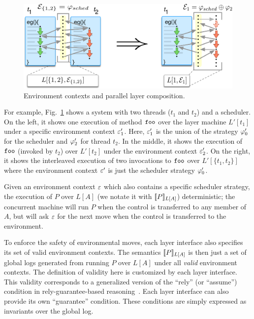 \begin{figure}[t]
\centering
\includegraphics[scale=.38]{figs/ccal/pcomp}
\caption{Environment contexts and parallel layer composition.}
\label{fig:pcomp}
\end{figure}

For example, Fig.~\ref{fig:pcomp} shows a system with two threads
($t_1$ and $t_2$) and a scheduler. On the left, it shows one execution
of method $\codeinmath{foo}$ over the layer machine $L'[t_1]$ under a specific
environment context $\oracle'_1$.  Here, $\oracle'_1$ is the union of
the strategy $\stratp{0}$ for the scheduler and $\stratp{2}$ for
thread $t_2$. In the middle, it shows the execution of $\codeinmath{foo}$
(invoked by $t_2$) over $L'[t_2]$ under the environment context
$\oracle'_2$. On the right, it shows the interleaved execution of
two invocations to $\codeinmath{foo}$ over $L'[\{t_1,t_2\}]$
where the environment context $\oracle'$ is just the scheduler
strategy $\stratp{0}$.

Given an environment context $\oracle$ which also contains a specific
scheduler strategy, the execution of $P$ over $L[A]$ (we notate it with $\sem{L[A]}{P}$)
deterministic; the concurrent machine will run $P$ when the control is
transferred to any member of $A$, but will ask $\oracle$ for the next
move when the control is transferred to the environment.

To enforce the safety of environmental moves,
each layer interface also specifies its set of valid environment contexts.
The semantics $\sem{L[A]}{P}$ is then just a set of global logs
generated from running $P$ over $L[A]$ under all {\em valid}
environment contexts. 
The definition of validity here is customized
by each layer interface.
This validity  corresponds to a generalized version of
the ``rely'' (or ``assume'') condition in rely-guarantee-based
reasoning~\cite{feng07:sagl,vafeiadis:marriage,LRG,fu10:roch,sergey15}. Each layer interface can also
provide its own ``guarantee'' condition. These conditions  are simply expressed as
invariants over the global log. 


